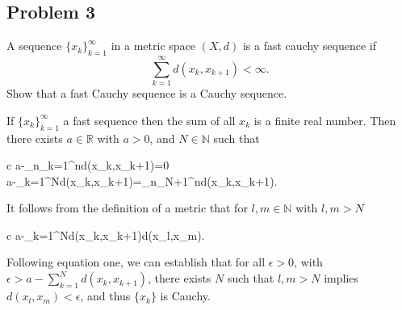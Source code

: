 \documentclass{article}
\begin{document}
\subsection*{Problem 3}
A sequence \(\{x_k\}_{k=1}^{\infty}\) in a metric space \((X,d)\) is a fast cauchy sequence if
\begin{equation*}
	\sum_{k=1}^{\infty}d(x_k,x_{k+1})<\infty.
\end{equation*}
Show that a fast Cauchy sequence is a Cauchy sequence.
\begin{IEEEproof}
	If \(\{x_k\}_{k=1}^{\infty}\) a fast sequence then the sum of all \(x_k\) is a finite real number. Then there exists \(a\in\mathbb{R}\) with \(a>0\), and \(N\in\mathbb{N}\) such that
	\begin{IEEEeqnarray}{c}
		a-\lim_{n\rightarrow\infty}\sum_{k=1}^{n}d(x_k,x_{k+1})=0\\
		a-\sum_{k=1}^{N}d(x_k,x_{k+1})=\lim_{n\rightarrow\infty}\sum_{N+1}^{n}d(x_k,x_{k+1}).
	\end{IEEEeqnarray}
	It follows from the definition of a metric that for \(l,m\in\mathbb{N}\) with \(l,m>N\)
	\begin{IEEEeqnarray}{c}
		a-\sum_{k=1}^{N}d(x_k,x_{k+1})\geq d(x_l,x_m).
	\end{IEEEeqnarray}
	Following equation one, we can establish that for all \(\epsilon>0\), with \(\epsilon>a-\sum_{k=1}^{N}d(x_k,x_{k+1})\), there exists \(N\) such that \(l,m>N\) implies \(d(x_l,x_m)<\epsilon\), and thus \(\{x_k\}\) is Cauchy.
\end{IEEEproof}
\end{document}
